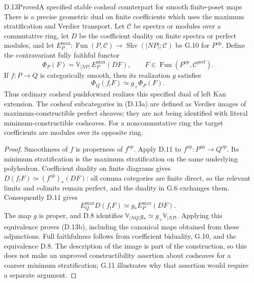 \begin{claim}{D.13}{Proved}{A specified stable cosheaf counterpart for smooth finite-poset maps}
There is a precise geometric dual on finite coefficients which uses
the maximum stratification and Verdier transport. Let $\mathcal C$
be spectra or modules over a commutative ring, let $D$ be the
coefficient duality on finite spectra or perfect modules, and let
$E_P^{\max}:\operatorname{Fun}(P,\mathcal C)\to
\operatorname{Shv}(|NP|;\mathcal C)$ be G.10 for $P^{\mathrm{op}}$.
Define the contravariant fully faithful functor
\[
 \Phi_P(F)=\mathbb V_{|NP|}\,E_P^{\max}(DF),
 \qquad F\in\operatorname{Fun}(P^{\mathrm{op}},\mathcal C^{\mathrm{perf}}).
\tag{D.13a}
\]
If $f:P\to Q$ is categorically smooth, then its realization $g$
satisfies
\[
 \Phi_Q(f_!F)\simeq g_+\Phi_P(F).
\tag{D.13b}
\]
Thus ordinary cosheaf pushforward realizes this specified dual of
left Kan extension. The cosheaf subcategories in (D.13a) are
defined as Verdier images of maximum-constructible perfect sheaves;
they are not being identified with literal minimum-constructible
cosheaves. For a noncommutative ring the target coefficients are
modules over its opposite ring.
\end{claim}
\begin{proof}
Smoothness of $f$ is properness of $f^{\mathrm{op}}$.
Apply D.11 to $f^{\mathrm{op}}:P^{\mathrm{op}}\to Q^{\mathrm{op}}$.
Its minimum stratification is the maximum stratification on the
same underlying polyhedron. Coefficient duality on finite diagrams
gives
$D(f_!F)\simeq(f^{\mathrm{op}})_*(DF)$: all comma categories are
finite direct, so the relevant limits and colimits remain perfect,
and the duality in G.6 exchanges them. Consequently D.11 gives
\[
 E_Q^{\max}D(f_!F)\simeq g_*E_P^{\max}(DF).
\]
The map $g$ is proper, and D.8 identifies
$\mathbb V_{|NQ|}g_*\simeq g_+\mathbb V_{|NP|}$.
Applying this equivalence proves (D.13b), including the canonical
maps obtained from these adjunctions. Full faithfulness follows
from coefficient biduality, G.10, and the equivalence D.8.
The description of the image is part of the construction, so this
does not make an unproved constructibility assertion about
cosheaves for a coarser minimum stratification; G.11 illustrates why
that assertion would require a separate argument.
\end{proof}
